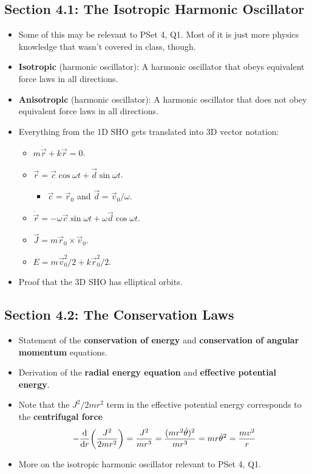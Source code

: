 \documentclass[../notes.tex]{subfiles}
\begin{document}
\subsection*{Section 4.1: The Isotropic Harmonic Oscillator}
\begin{itemize}
    \item {}Some of this may be relevant to PSet 4, Q1. Most of it is just more physics knowledge that wasn't covered in class, though.
    \item \textbf{Isotropic} (harmonic oscillator): A harmonic oscillator that obeys equivalent force laws in all directions.
    \item \textbf{Anisotropic} (harmonic oscillator): A harmonic oscillator that does not obey equivalent force laws in all directions.
    \item Everything from the 1D SHO gets translated into 3D vector notation:
    \begin{itemize}
        \item $m\ddot{\vec{r}}+k\vec{r}=0$.
        \item $\vec{r}=\vec{c}\cos\omega t+\vec{d}\sin\omega t$.
        \begin{itemize}
            \item $\vec{c}=\vec{r}_0$ and $\vec{d}=\vec{v}_0/\omega$.
        \end{itemize}
        \item $\dot{\vec{r}}=-\omega\vec{c}\sin\omega t+\omega\vec{d}\cos\omega t$.
        \item $\vec{J}=m\vec{r}_0\times\vec{v}_0$.
        \item $E=m\vec{v}_0^2/2+k\vec{r}_0^2/2$.
    \end{itemize}
    \item Proof that the 3D SHO has elliptical orbits.
\end{itemize}


\subsection*{Section 4.2: The Conservation Laws}
\begin{itemize}
    \item Statement of the \textbf{conservation of energy} and \textbf{conservation of angular momentum} equations.
    \item Derivation of the \textbf{radial energy equation} and \textbf{effective potential energy}.
    \item Note that the $J^2/2mr^2$ term in the effective potential energy corresponds to the \textbf{centrifugal force}
    \begin{equation*}
        -\dv{r}(\frac{J^2}{2mr^2}) = \frac{J^2}{mr^3}
        = \frac{(mr^2\dot{\theta})^2}{mr^3}
        = mr\dot{\theta}^2
        = \frac{mv^2}{r}
    \end{equation*}
    \item More on the isotropic harmonic oscillator relevant to PSet 4, Q1.
\end{itemize}
\end{document}
